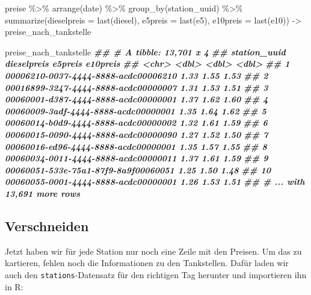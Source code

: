 \documentclass[
  ngerman,
]{article}
\newenvironment{Shaded}{\begin{snugshade}}{\end{snugshade}}
\newcommand{\AttributeTok}[1]{\textcolor[rgb]{0.77,0.63,0.00}{#1}}
\newcommand{\DocumentationTok}[1]{\textcolor[rgb]{0.56,0.35,0.01}{\textbf{\textit{#1}}}}
\newcommand{\FunctionTok}[1]{\textcolor[rgb]{0.00,0.00,0.00}{#1}}
\newcommand{\NormalTok}[1]{#1}
\newcommand{\OtherTok}[1]{\textcolor[rgb]{0.56,0.35,0.01}{#1}}
\newcommand{\SpecialCharTok}[1]{\textcolor[rgb]{0.00,0.00,0.00}{#1}}
\begin{document}
\begin{Shaded}
\begin{Highlighting}[]
\NormalTok{preise }\SpecialCharTok{\%\textgreater{}\%}
  \FunctionTok{arrange}\NormalTok{(date) }\SpecialCharTok{\%\textgreater{}\%}
  \FunctionTok{group\_by}\NormalTok{(station\_uuid) }\SpecialCharTok{\%\textgreater{}\%}
  \FunctionTok{summarize}\NormalTok{(}\AttributeTok{dieselpreis =} \FunctionTok{last}\NormalTok{(diesel),}
            \AttributeTok{e5preis     =} \FunctionTok{last}\NormalTok{(e5),}
            \AttributeTok{e10preis    =} \FunctionTok{last}\NormalTok{(e10)) }\OtherTok{{-}\textgreater{}}
\NormalTok{  preise\_nach\_tankstelle}

\NormalTok{preise\_nach\_tankstelle}
\DocumentationTok{\#\# \# A tibble: 13,701 x 4}
\DocumentationTok{\#\#    station\_uuid                         dieselpreis e5preis e10preis}
\DocumentationTok{\#\#    \textless{}chr\textgreater{}                                      \textless{}dbl\textgreater{}   \textless{}dbl\textgreater{}    \textless{}dbl\textgreater{}}
\DocumentationTok{\#\#  1 00006210{-}0037{-}4444{-}8888{-}acdc00006210        1.33    1.55     1.53}
\DocumentationTok{\#\#  2 00016899{-}3247{-}4444{-}8888{-}acdc00000007        1.31    1.53     1.51}
\DocumentationTok{\#\#  3 00060001{-}d387{-}4444{-}8888{-}acdc00000001        1.37    1.62     1.60}
\DocumentationTok{\#\#  4 00060009{-}3adf{-}4444{-}8888{-}acdc00000001        1.35    1.64     1.62}
\DocumentationTok{\#\#  5 00060014{-}b0d9{-}4444{-}8888{-}acdc00000002        1.32    1.61     1.59}
\DocumentationTok{\#\#  6 00060015{-}0090{-}4444{-}8888{-}acdc00000090        1.27    1.52     1.50}
\DocumentationTok{\#\#  7 00060016{-}ed96{-}4444{-}8888{-}acdc00000001        1.35    1.57     1.55}
\DocumentationTok{\#\#  8 00060034{-}0011{-}4444{-}8888{-}acdc00000011        1.37    1.61     1.59}
\DocumentationTok{\#\#  9 00060051{-}533e{-}75a1{-}87f9{-}8a9f00060051        1.25    1.50     1.48}
\DocumentationTok{\#\# 10 00060055{-}0001{-}4444{-}8888{-}acdc00000001        1.26    1.53     1.51}
\DocumentationTok{\#\# \# ... with 13,691 more rows}
\end{Highlighting}
\end{Shaded}

\hypertarget{verschneiden-1}{%
\subsection{Verschneiden}\label{verschneiden-1}}

Jetzt haben wir für jede Station nur noch eine Zeile mit den Preisen.
Um das zu kartieren, fehlen noch die Informationen zu den Tankstellen. Dafür laden wir auch den \texttt{stations}-Datensatz für den richtigen Tag herunter und importieren ihn in R:
\end{document}
